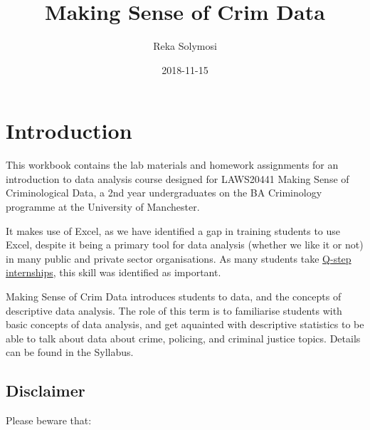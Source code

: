 \documentclass[]{book}
\title{Making Sense of Crim Data}
\author{Reka Solymosi}
\date{2018-11-15}
\theoremstyle{definition}
\theoremstyle{definition}
\theoremstyle{definition}
\theoremstyle{remark}
\begin{document}
\maketitle

{
\setcounter{tocdepth}{1}
\tableofcontents
}
\hypertarget{introduction}{%
\chapter*{Introduction}\label{introduction}}

This workbook contains the lab materials and homework assignments for an
introduction to data analysis course designed for LAWS20441 Making Sense
of Criminological Data, a 2nd year undergraduates on the BA Criminology
programme at the University of Manchester.

It makes use of Excel, as we have identified a gap in training students
to use Excel, despite it being a primary tool for data analysis (whether
we like it or not) in many public and private sector organisations. As
many students take
\href{https://www.humanities.manchester.ac.uk/q-step/}{Q-step
internships}, this skill was identified as important.

Making Sense of Crim Data introduces students to data, and the concepts
of descriptive data analysis. The role of this term is to familiarise
students with basic concepts of data analysis, and get aquainted with
descriptive statistics to be able to talk about data about crime,
policing, and criminal justice topics. Details can be found in the
Syllabus.

\hypertarget{disclaimer}{%
\section{Disclaimer}\label{disclaimer}}

Please beware that:
\end{document}
